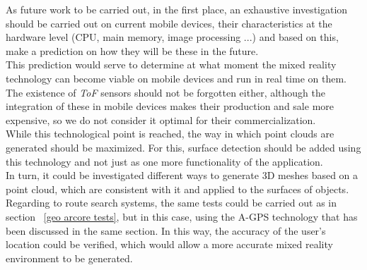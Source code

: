 As future work to be carried out, in the first place, an exhaustive investigation should be carried out on current mobile devices, their characteristics at the hardware level (CPU, main memory, image processing ...) and based on this, make a prediction on how they will be these in the future. \\

This prediction would serve to determine at what moment the mixed reality technology can become viable on mobile devices and run in real time on them. \\

The existence of \textit{ToF} sensors should not be forgotten either, although the integration of these in mobile devices makes their production and sale more expensive, so we do not consider it optimal for their commercialization. \\

While this technological point is reached, the way in which point clouds are generated should be maximized. For this, surface detection should be added using this technology and not just as one more functionality of the application. \\

In turn, it could be investigated different ways to generate 3D meshes based on a point cloud, which are consistent with it and applied to the surfaces of objects. \\

Regarding to route search systems, the same tests could be carried out as in section ~\ref{geo arcore tests}, but in this case, using the A-GPS technology that has been discussed in the same section. In this way, the accuracy of the user's location could be verified, which would allow a more accurate mixed reality environment to be generated.